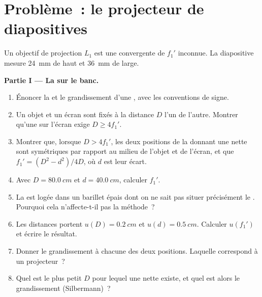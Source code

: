 \section{Problème~: le projecteur de diapositives}

\begin{problem}
\label{pb:b1:mirrors-thin-lenses:1}
Un objectif de projection $L_1$ est une  convergente de
 $f_1'$ inconnue. La diapositive mesure \qty{24}{mm} de
haut et \qty{36}{mm} de large.

\medskip
\noindent\textbf{Partie I --- La  sur le banc.}
\begin{enumerate}
  \item Énoncer la  et le grandissement d'une
        , avec les conventions de signe.
  \item Un objet et un écran sont fixés à la distance $D$ l'un de
        l'autre. Montrer qu'une  sur l'écran exige
        $D \geq 4f_1'$.
  \item Montrer que, lorsque $D > 4f_1'$, les deux positions de la
         donnant une  nette sont symétriques par rapport au
        milieu de l'objet et de l'écran, et que
        $f_1' = (D^2 - d^2)/4D$, où $d$ est leur écart.
  \item Avec $D = \qty{80.0}{cm}$ et $d = \qty{40.0}{cm}$, calculer
        $f_1'$.
  \item La  est logée dans un barillet épais dont on ne sait pas
        situer précisément le . Pourquoi cela
        n'affecte-t-il pas la méthode~?
  \item Les distances portent $u(D) = \qty{0.2}{cm}$ et
        $u(d) = \qty{0.5}{cm}$. Calculer $u(f_1')$ et écrire le résultat.
  \item Donner le grandissement à chacune des deux positions. Laquelle
        correspond à un projecteur~?
  \item Quel est le plus petit $D$ pour lequel une  nette existe, et
        quel est alors le grandissement (Silbermann)~?
\end{enumerate}


\end{problem}
